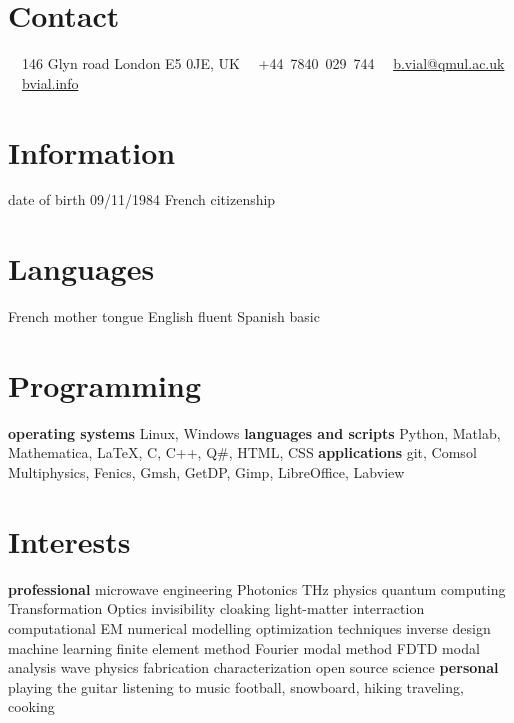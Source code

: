 \documentclass{cv}
\begin{document}


\begin{aside} %
	\section{Contact}
	\faHome~~146 Glyn road
	London E5 0JE, UK
	\faPhone~~+44~7840~029~744
	\faEnvelope~~\href{mailto:b.vial@qmul.ac.uk}{b.vial@qmul.ac.uk}
	\faUser~~\href{http://bvial.info/}{bvial.info}
	\section{Information}
	date of birth 09/11/1984
	French citizenship
	\section{Languages}
	French mother tongue
	English fluent
	Spanish basic
	\section{Programming}
	\textbf{operating systems}
	Linux, Windows
	\textbf{languages and scripts}
	Python, Matlab, Mathematica, \LaTeX, C, C++, Q\#, HTML, CSS
	\textbf{applications}
	git, Comsol Multiphysics, Fenics, Gmsh, GetDP, Gimp, LibreOffice, Labview
	\section{Interests}
	\textbf{professional}
	microwave engineering
	Photonics
	THz physics
	quantum computing
	Transformation Optics
	invisibility cloaking
	light-matter interraction
	computational EM
	numerical modelling
	optimization techniques
	inverse design
	machine learning
	finite element method
	Fourier modal method
	FDTD
	modal analysis
	wave physics
	fabrication
	characterization
	open source science
	\textbf{personal}
	playing the guitar
	listening to music
	football, snowboard, hiking
	traveling, cooking
\end{aside}


\end{document}
